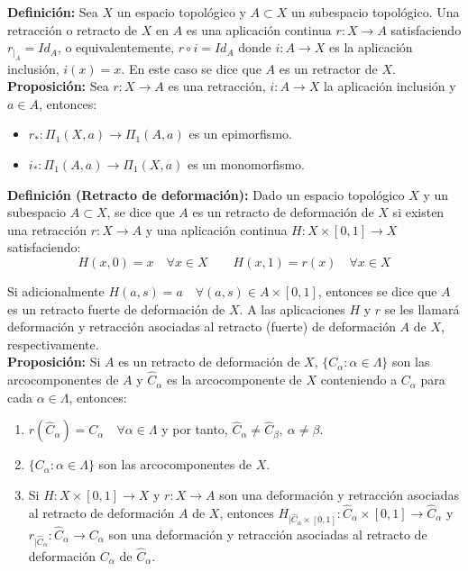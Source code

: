 \documentclass{article}
\begin{document}
\textbf{Definición:} Sea $X$ un espacio topológico y $A\subset X$ un subespacio topológico. Una retracción o retracto de $X$ en $A$ es una aplicación continua $r:X\rightarrow A$ satisfaciendo $r_{|_A}=Id_A$, o equivalentemente, $r\circ i=Id_A$ donde $i:A\rightarrow X$ es la aplicación inclusión, $i(x)=x$. En este caso se dice que $A$ es un retractor de $X$. \\

\textbf{Proposición:} Sea $r:X\rightarrow A$ es una retracción, $i:A\rightarrow X$ la aplicación inclusión y $a\in A$, entonces:
\begin{itemize}
\item $r_*:\Pi_1(X,a)\rightarrow\Pi_1(A,a)$ es un epimorfismo.

\item $i_*:\Pi_1(A,a)\rightarrow\Pi_1(X,a)$ es un monomorfismo.
\end{itemize}

\textbf{Definición (Retracto de deformación):} Dado un espacio topológico $X$ y un subespacio $A\subset X$, se dice que $A$ es un retracto de deformación de $X$ si existen una retracción $r:X\rightarrow A$ y una aplicación continua $H:X\times[0,1]\rightarrow X$ satisfaciendo:
\begin{equation*}
H(x,0)=x\quad \forall x\in X\qquad H(x,1)=r(x)\quad \forall x\in X
\end{equation*}

Si adicionalmente $H(a,s)=a\quad \forall(a,s)\in A\times [0,1]$, entonces se dice que $A$ es un retracto fuerte de deformación de $X$. A las aplicaciones $H$ y $r$ se les llamará deformación y retracción asociadas al retracto (fuerte) de deformación $A$ de $X$, respectivamente.\\

\textbf{Proposición:} Si $A$ es un retracto de deformación de $X$, $\{C_\alpha:\alpha\in \Lambda\}$ son las arcocomponentes de $A$ y $\hat{C}_\alpha$ es la arcocomponente de $X$ conteniendo a $C_\alpha$ para cada $\alpha\in \Lambda$, entonces:
\begin{enumerate}
\item $r(\hat{C}_\alpha)=C_\alpha \quad \forall\alpha\in\Lambda$ y por tanto, $\hat{C}_\alpha\neq \hat{C}_\beta,\:\alpha\neq \beta$.

\item $\{C_\alpha:\alpha\in\Lambda\}$ son las arcocomponentes de $X$.

\item Si $H:X\times [0,1]\rightarrow X$ y $r:X\rightarrow A$ son una deformación y retracción asociadas al retracto de deformación $A$ de $X$, entonces $H_{|\hat{C}_\alpha\times[0,1]}:\hat{C}_\alpha\times[0,1]\rightarrow \hat{C}_\alpha$ y $r_{|\hat{C}_\alpha}:\hat{C}_\alpha\rightarrow C_\alpha$ son una deformación y retracción asociadas al retracto de deformación $C_\alpha$ de $\hat{C}_\alpha$.
\end{enumerate}
\end{document}
